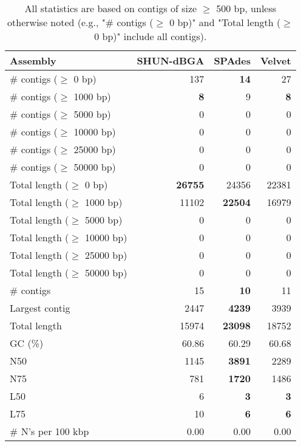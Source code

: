 \documentclass[12pt,a4paper]{article}
\begin{document}
\begin{table}[ht]
\begin{center}
\caption{All statistics are based on contigs of size $\geq$ 500 bp, unless otherwise noted (e.g., "\# contigs ($\geq$ 0 bp)" and "Total length ($\geq$ 0 bp)" include all contigs).}
\begin{tabular}{|l*{3}{|r}|}
\hline
Assembly & SHUN-dBGA & SPAdes & Velvet \\ \hline
\# contigs ($\geq$ 0 bp) & 137 & {\bf 14} & 27 \\ \hline
\# contigs ($\geq$ 1000 bp) & {\bf 8} & 9 & {\bf 8} \\ \hline
\# contigs ($\geq$ 5000 bp) & 0 & 0 & 0 \\ \hline
\# contigs ($\geq$ 10000 bp) & 0 & 0 & 0 \\ \hline
\# contigs ($\geq$ 25000 bp) & 0 & 0 & 0 \\ \hline
\# contigs ($\geq$ 50000 bp) & 0 & 0 & 0 \\ \hline
Total length ($\geq$ 0 bp) & {\bf 26755} & 24356 & 22381 \\ \hline
Total length ($\geq$ 1000 bp) & 11102 & {\bf 22504} & 16979 \\ \hline
Total length ($\geq$ 5000 bp) & 0 & 0 & 0 \\ \hline
Total length ($\geq$ 10000 bp) & 0 & 0 & 0 \\ \hline
Total length ($\geq$ 25000 bp) & 0 & 0 & 0 \\ \hline
Total length ($\geq$ 50000 bp) & 0 & 0 & 0 \\ \hline
\# contigs & 15 & {\bf 10} & 11 \\ \hline
Largest contig & 2447 & {\bf 4239} & 3939 \\ \hline
Total length & 15974 & {\bf 23098} & 18752 \\ \hline
GC (\%) & 60.86 & 60.29 & 60.68 \\ \hline
N50 & 1145 & {\bf 3891} & 2289 \\ \hline
N75 & 781 & {\bf 1720} & 1486 \\ \hline
L50 & 6 & {\bf 3} & {\bf 3} \\ \hline
L75 & 10 & {\bf 6} & {\bf 6} \\ \hline
\# N's per 100 kbp & 0.00 & 0.00 & 0.00 \\ \hline
\end{tabular}
\end{center}
\end{table}
\end{document}
